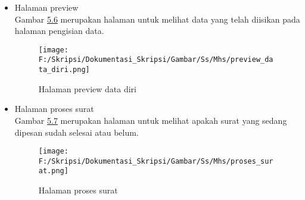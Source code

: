 \begin{itemize}
	\item Halaman preview\\
	Gambar \hyperlink{halaman_preview_data_diri}{5.6} merupakan halaman untuk melihat data yang telah diisikan pada halaman pengisian data.
	\begin{figure}[H]
	\centering
		\texttt{[image: F:/Skripsi/Dokumentasi\_Skripsi/Gambar/Ss/Mhs/preview\_data\_diri.png]}
		\caption{Halaman preview data diri}
		\label{fig:halaman_preview_data_diri}
	\end{figure}

\item Halaman proses surat\\
	Gambar \hyperlink{halaman_proses_surat}{5.7} merupakan halaman untuk melihat apakah surat yang sedang dipesan sudah selesai atau belum.
	\begin{figure}[H]
	\centering
		\texttt{[image: F:/Skripsi/Dokumentasi\_Skripsi/Gambar/Ss/Mhs/proses\_surat.png]}
		\caption{Halaman proses surat}
		\label{fig:halaman_proses_surat}
	\end{figure}
\end{itemize}

